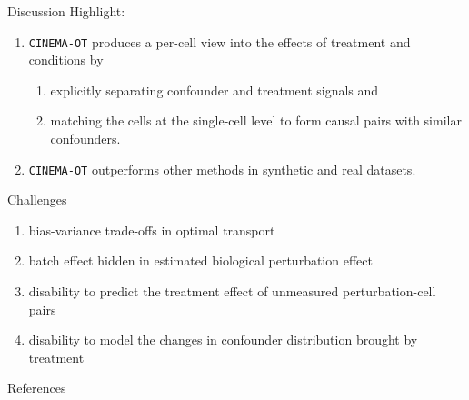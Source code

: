 \documentclass[10pt]{beamer}
\begin{document}
\begin{frame}{Discussion}
    Highlight:
    \begin{enumerate}
        \item \texttt{CINEMA-OT} produces a per-cell view into the effects of treatment and conditions by
        \begin{enumerate}
            \item explicitly separating confounder and treatment signals and
            \item matching the cells at the single-cell level to form causal pairs with similar confounders.
        \end{enumerate}

        \item \texttt{CINEMA-OT} outperforms other methods in synthetic and real datasets.
    \end{enumerate}

    \bigskip
    Challenges
    \begin{enumerate}
        \item bias-variance trade-offs in optimal transport
        \item batch effect hidden in estimated biological perturbation effect
        \item disability to predict the treatment effect of unmeasured perturbation-cell pairs
        \item disability to model the changes in confounder distribution brought by treatment
    \end{enumerate}
\end{frame}


\begin{frame}[allowframebreaks]{References}
    \footnotesize
    \nocite{}
    
    
\end{frame}








\end{document}
